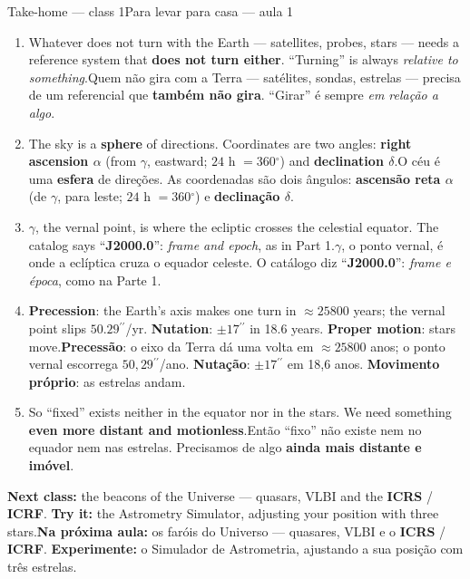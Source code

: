 \documentclass[aspectratio=169,11pt]{beamer}
\newcommand{\tr}[2]{\ifEN#2\else#1\fi}
\newcommand{\bnum}[1]{\textbf{\textcolor{mTeal}{#1}}}
\newcommand{\sist}[1]{\textcolor{corSist}{\textbf{#1}}}
\newcommand{\fram}[1]{\textcolor{corFrame}{\textbf{#1}}}
\newcommand{\asec}{\ensuremath{{}^{\prime\prime}}}
\newcommand{\gr}{\ensuremath{{}^{\circ}}}
\begin{document}
\begin{frame}{\tr{Para levar para casa --- aula 1}{Take-home --- class 1}}
  \footnotesize
  \begin{enumerate}
    \setlength{\itemsep}{2pt}
    \item \tr{Quem não gira com a Terra --- satélites, sondas, estrelas --- precisa de um
          referencial que \bnum{também não gira}. ``Girar'' é sempre \emph{em relação a
          algo}.}{Whatever does not turn with the Earth --- satellites, probes, stars --- needs a
          reference system that \bnum{does not turn either}. ``Turning'' is always
          \emph{relative to something}.}
    \item \tr{O céu é uma \bnum{esfera} de direções. As coordenadas são dois ângulos:
          \textcolor{corTempo}{\textbf{ascensão reta $\alpha$}} (de $\gamma$, para leste; $24$ h
          $= 360\gr$) e \textcolor{corErro}{\textbf{declinação $\delta$}}.}{The sky is a
          \bnum{sphere} of directions. Coordinates are two angles: \textcolor{corTempo}{\textbf{right
          ascension $\alpha$}} (from $\gamma$, eastward; $24$ h $= 360\gr$) and
          \textcolor{corErro}{\textbf{declination $\delta$}}.}
    \item \tr{$\gamma$, o ponto vernal, é onde a eclíptica cruza o equador celeste. O catálogo
          diz ``\bnum{J2000.0}'': \emph{frame e época}, como na Parte 1.}{$\gamma$, the vernal
          point, is where the ecliptic crosses the celestial equator. The catalog says
          ``\bnum{J2000.0}'': \emph{frame and epoch}, as in Part 1.}
    \item \tr{\bnum{Precessão}: o eixo da Terra dá uma volta em $\approx \num{25800}$ anos; o
          ponto vernal escorrega $50{,}29\asec$/ano. \bnum{Nutação}: $\pm 17\asec$ em 18,6
          anos. \bnum{Movimento próprio}: as estrelas andam.}{\bnum{Precession}: the Earth's
          axis makes one turn in $\approx \num{25800}$ years; the vernal point slips
          $50.29\asec$/yr. \bnum{Nutation}: $\pm 17\asec$ in 18.6 years. \bnum{Proper motion}:
          stars move.}
    \item \tr{Então ``fixo'' não existe nem no equador nem nas estrelas. Precisamos de algo
          \bnum{ainda mais distante e imóvel}.}{So ``fixed'' exists neither in the equator nor in
          the stars. We need something \bnum{even more distant and motionless}.}
  \end{enumerate}
  \begin{ideia}
    \scriptsize \tr{\textbf{Na próxima aula:} os faróis do Universo --- quasares, VLBI e o
    \sist{ICRS} / \fram{ICRF}. \textbf{Experimente:} o Simulador de Astrometria, ajustando a sua
    posição com três estrelas.}{\textbf{Next class:} the beacons of the Universe --- quasars,
    VLBI and the \sist{ICRS} / \fram{ICRF}. \textbf{Try it:} the Astrometry Simulator, adjusting
    your position with three stars.}
  \end{ideia}
\end{frame}
\end{document}
